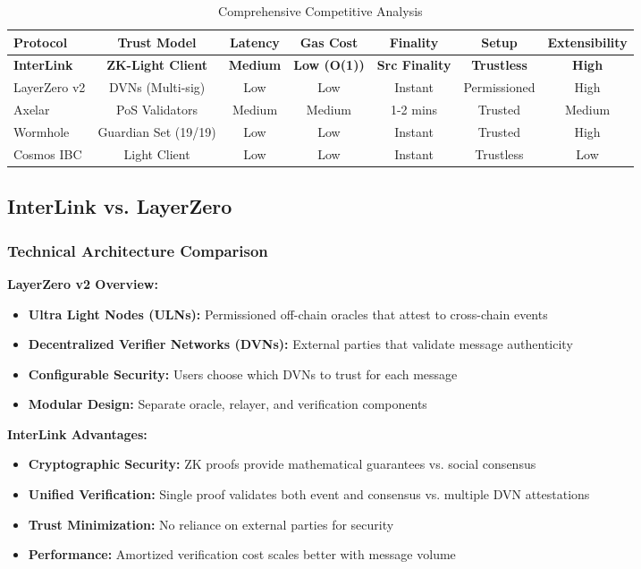 \documentclass[11pt,a4paper]{article}
\begin{document}
\begin{table}[H]
\centering
\small
\begin{tabular}{@{}lcccccc@{}}
\toprule
\textbf{Protocol} & \textbf{Trust Model} & \textbf{Latency} & \textbf{Gas Cost} & \textbf{Finality} & \textbf{Setup} & \textbf{Extensibility} \\ \midrule
\textbf{InterLink} & \textbf{ZK-Light Client} & \textbf{Medium} & \textbf{Low (O(1))} & \textbf{Src Finality} & \textbf{Trustless} & \textbf{High} \\
LayerZero v2 & DVNs (Multi-sig) & Low & Low & Instant & Permissioned & High \\
Axelar & PoS Validators & Medium & Medium & 1-2 mins & Trusted & Medium \\
Wormhole & Guardian Set (19/19) & Low & Low & Instant & Trusted & High \\
Cosmos IBC & Light Client & Low & Low & Instant & Trustless & Low \\ \bottomrule
\end{tabular}
\caption{Comprehensive Competitive Analysis}
\label{tab:comparison_detailed}
\end{table}

\subsection{InterLink vs. LayerZero}

\subsubsection{Technical Architecture Comparison}

\textbf{LayerZero v2 Overview:}
\begin{itemize}
    \item \textbf{Ultra Light Nodes (ULNs):} Permissioned off-chain oracles that attest to cross-chain events
    \item \textbf{Decentralized Verifier Networks (DVNs):} External parties that validate message authenticity
    \item \textbf{Configurable Security:} Users choose which DVNs to trust for each message
    \item \textbf{Modular Design:} Separate oracle, relayer, and verification components
\end{itemize}

\textbf{InterLink Advantages:}
\begin{itemize}
    \item \textbf{Cryptographic Security:} ZK proofs provide mathematical guarantees vs. social consensus
    \item \textbf{Unified Verification:} Single proof validates both event and consensus vs. multiple DVN attestations
    \item \textbf{Trust Minimization:} No reliance on external parties for security
    \item \textbf{Performance:} Amortized verification cost scales better with message volume
\end{itemize}
\end{document}
